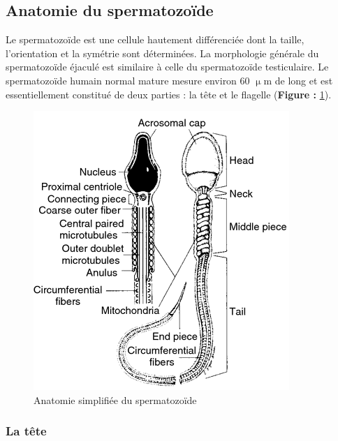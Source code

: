 \documentclass[12pt,twoside]{reedthesis}
\theoremstyle{definition}
\theoremstyle{definition}
\theoremstyle{remark}
\begin{document}
  \subsection{Anatomie du spermatozoïde}\label{anatomie-du-spermatozoide}
  
  Le spermatozoïde est une cellule hautement différenciée dont la taille,
  l'orientation et la symétrie sont déterminées. La morphologie générale
  du spermatozoïde éjaculé est similaire à celle du spermatozoïde
  testiculaire. Le spermatozoïde humain normal mature mesure environ 60
  \(\upmu\)m de long et est essentiellement constitué de deux parties : la
  tête et le flagelle (\textbf{Figure : }\ref{fig:spz}).
  
  \begin{figure}
  
  {\centering \includegraphics[scale=.75]{figure/sperm_anatomy} 
  
  }
  
  \caption[Anatomie simplifiée du spermatozoïde]{Anatomie simplifiée du spermatozoïde}\label{fig:spz}
  \end{figure}
  
  \subsubsection{La tête}\label{la-tete}
  
\end{document}
